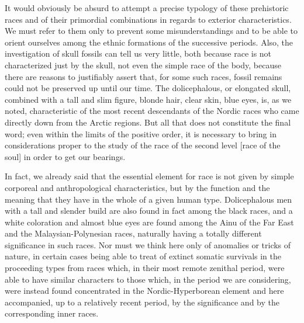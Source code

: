 It would obviously be absurd to attempt a precise typology of these prehistoric races and of their primordial combinations in regards to exterior characteristics. We must refer to them only to prevent some misunderstandings and to be able to orient ourselves among the ethnic formations of the successive periods. Also, the investigation of skull fossils can tell us very little, both because race is not characterized just by the skull, not even the simple race of the body, because there are reasons to justifiably assert that, for some such races, fossil remains could not be preserved up until our time. The dolicephalous, or elongated skull, combined with a tall and slim figure, blonde hair, clear skin, blue eyes, is, as we noted, characteristic of the most recent descendants of the Nordic races who came directly down from the Arctic regions. But all that does not constitute the final word; even within the limits of the positive order, it is necessary to bring in considerations proper to the study of the race of the second level [race of the soul] in order to get our bearings.

In fact, we already said that the essential element for race is not given by simple corporeal and anthropological characteristics, but by the function and the meaning that they have in the whole of a given human type. Dolicephalous men with a tall and slender build are also found in fact among the black races, and a white coloration and almost blue eyes are found among the Ainu of the Far East and the Malaysian-Polynesian races, naturally having a totally different significance in such races. Nor must we think here only of anomalies or tricks of nature, in certain cases being able to treat of extinct somatic survivals in the proceeding types from races which, in their most remote zenithal period, were able to have similar characters to those which, in the period we are considering, were instead found concentrated in the Nordic-Hyperborean element and here accompanied, up to a relatively recent period, by the significance and by the corresponding inner races.

